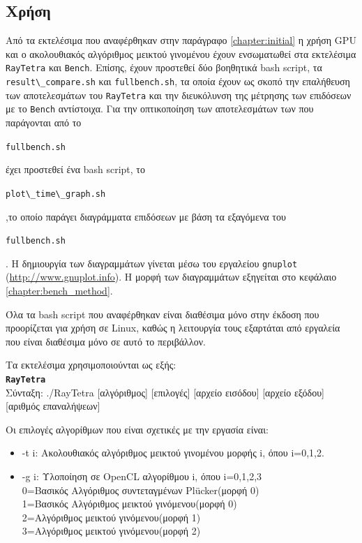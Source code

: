 \subsection{Χρήση} 
\noindent Από τα εκτελέσιμα που αναφέρθηκαν στην παράγραφο \ref{chapter:initial} η χρήση GPU και ο ακολουθιακός αλγόριθμος μεικτού γινομένου έχουν ενσωματωθεί στα εκτελέσιμα \verb!RayTetra! και \verb!Bench!. Επίσης, έχουν προστεθεί δύο βοηθητικά bash script, τα \verb!result\_compare.sh! και \verb!fullbench.sh!, τα οποία έχουν ως σκοπό την επαλήθευση των αποτελεσμάτων του \verb!RayTetra! και την διευκόλυνση της μέτρησης των επιδόσεων με το \verb!Bench! αντίστοιχα. Για την οπτικοποίηση των αποτελεσμάτων των που παράγονται από το \begin{english}\verb!fullbench.sh!\end{english} έχει προστεθεί ένα bash script, το \begin{english}\verb!plot\_time\_graph.sh!\end{english},το οποίο παράγει διαγράμματα επιδόσεων με βάση τα εξαγόμενα του \begin{english}\verb!fullbench.sh!\end{english}. Η δημιουργία των διαγραμμάτων γίνεται μέσω του εργαλείου \verb!gnuplot! (\url{http://www.gnuplot.info}). Η μορφή των διαγραμμάτων εξηγείται στο κεφάλαιο \ref{chapter:bench_method}. 

Όλα τα bash script που αναφέρθηκαν είναι διαθέσιμα μόνο στην έκδοση  που προορίζεται για χρήση σε Linux, καθώς η λειτουργία τους εξαρτάται από εργαλεία που είναι διαθέσιμα μόνο σε αυτό το περιβάλλον.

\noindent Τα εκτελέσιμα χρησιμοποιούνται ως εξής:\\ 

\noindent\textbf{\verb!RayTetra!}\\
Σύνταξη: 
./RayTetra [αλγόριθμος] [επιλογές] [αρχείο εισόδου] 
[αρχείο εξόδου] [αριθμός επαναλήψεων]

\noindent Οι επιλογές αλγορίθμων που είναι σχετικές με την εργασία είναι:
\begin{itemize}
\item -t i: Ακολουθιακός αλγόριθμος μεικτού γινομένου μορφής i, όπου i=0,1,2.
\item -g i: Υλοποίηση σε OpenCL αλγορίθμου i, όπου i=0,1,2,3 
	\\0=Βασικός Αλγόριθμος συντεταγμένων Plücker(μορφή 0)
	\\1=Βασικός Αλγόριθμος μεικτού γινόμενου(μορφή 0)
	\\2=Αλγόριθμος μεικτού γινόμενου(μορφή 1)
	\\3=Αλγόριθμος μεικτού γινόμενου(μορφή 2)
\end{itemize}


